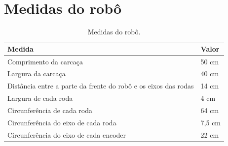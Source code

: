 \apendice

\chapter{Medidas do robô}
\label{cap:medidas_robo}


\begin{table}[h]
  \caption{Medidas do robô.}
  \centering
  \begin{tabular}{l|l}
    \toprule
    \textbf{Medida} & \textbf{Valor} \\
    \midrule
    Comprimento da carcaça & 50 cm \\ \hline
    Largura da carcaça & 40 cm \\ \hline
    Distância entre a parte da frente do robô e os eixos das rodas & 14 cm \\ \hline
    Largura de cada roda & 4 cm \\ \hline
    Circunferência de cada roda & 64 cm \\ \hline
    Circunferência do eixo de cada roda & 7,5 cm \\ \hline
    Circunferência do eixo de cada encoder & 22 cm \\ 
    \bottomrule
  \end{tabular}
  \label{tab:medidas_robo}
\end{table}

%


